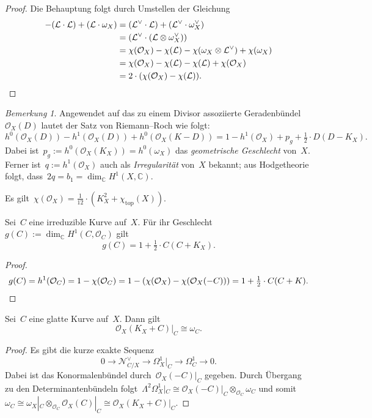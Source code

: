 \documentclass[a4paper,ngerman,12pt]{scrartcl}
\theoremstyle{definition}
\theoremstyle{plain}
\theoremstyle{remark}
\newtheorem{rem}[defn]{Bemerkung}
\newcommand{\CC}{\mathbb{C}}
\newcommand{\N}{\mathcal{N}}
\renewcommand{\L}{\mathcal{L}}
\renewcommand{\O}{\mathcal{O}}
\newcommand{\lra}{\longrightarrow}
\begin{document}
\begin{proof}Die Behauptung folgt durch Umstellen der Gleichung
\begin{align*}
  -(\L \cdot \L) + (\L \cdot \omega_X)
  &= (\L^\vee \cdot \L) + (\L^\vee \cdot \omega_X^\vee) \\
  &= (\L^\vee \cdot (\L \otimes \omega_X^\vee)) \\
  &= \chi(\O_X) - \chi(\L) - \chi(\omega_X \otimes \L^\vee) + \chi(\omega_X) \\
  &= \chi(\O_X) - \chi(\L) - \chi(\L) + \chi(\O_X) \\
  &= 2 \cdot (\chi(\O_X) - \chi(\L)). \qedhere
\end{align*}
\end{proof}

\begin{rem}Angewendet auf das zu einem Divisor assoziierte
Geradenbündel~$\O_X(D)$ lautet der Satz von Riemann--Roch wie folgt:
\[ h^0(\O_X(D)) - h^1(\O_X(D)) + h^0(\O_X(K-D)) =
  1 - h^1(\O_X) + p_g + \tfrac{1}{2} \cdot D(D-K_X). \]
Dabei ist~$p_g := h^0(\O_X(K_X)) = h^0(\omega_X)$ das \emph{geometrische
Geschlecht} von~$X$. Ferner ist~$q := h^1(\O_X)$ auch als \emph{Irregularität}
von~$X$ bekannt; aus Hodgetheorie folgt, dass~$2q = b_1 = \dim_\CC H^1(X,\CC)$.
\end{rem}

\begin{fact}
Es gilt~$\chi(\O_X) = \frac{1}{12} \cdot (K_X^2 +
\chi_\mathrm{top}(X))$.
\end{fact}

\begin{cor}[Geschlechtsformel]
Sei~$C$ eine irreduzible Kurve auf~$X$. Für ihr Geschlecht $g(C) :=
\dim_\CC H^1(C,\O_C)$ gilt
\[ g(C) = 1 + \tfrac{1}{2} \cdot C(C+K_X). \]
\end{cor}
\begin{proof}\[ g(C) = h^1(\O_C) = 1 - \chi(\O_C) = 1 - (\chi(\O_X) -
\chi(\O_X(-C))) = 1 + \tfrac{1}{2} \cdot C(C+K). \qedhere \]
\end{proof}

\begin{prop}[Adjunktionsformel]
Sei~$C$ eine glatte Kurve auf~$X$. Dann gilt \[ \O_X(K_X+C)|_C \cong \omega_C. \]
\end{prop}
\begin{proof}Es gibt die kurze exakte Sequenz
\[ 0 \lra \N_{C/X}^\vee \lra \Omega^1_X|_C \lra \Omega^1_C \lra 0. \]
Dabei ist das Konormalenbündel durch~$\O_X(-C)|_C$ gegeben. Durch Übergang zu
den Determinantenbündeln folgt~$\Lambda^2\Omega^1_X|_C \cong
\O_X(-C)|_C \otimes_{\O_C} \omega_C$ und somit~$\omega_C \cong \omega_X|_C
\otimes_{\O_C} \O_X(C)|_C \cong \O_X(K_X+C)|_C$.
\end{proof}

\end{document}
